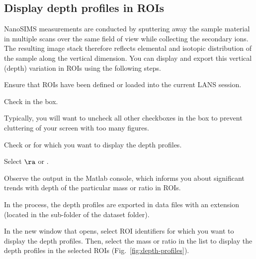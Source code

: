 \subsection{Display depth profiles in ROIs}
\setcounter{step}{0}

NanoSIMS measurements are conducted by sputtering away the sample material in multiple scans over the same field of view while collecting the secondary ions. The resulting image stack therefore reflects elemental and isotopic distribution of the sample along the vertical dimension. You can display and export this vertical (depth) variation in ROIs using the following steps.

\s Ensure that ROIs have been defined or loaded into the current LANS session.

\s Check  in the  box.

\bul Typically, you will want to uncheck all other checkboxes in the  box to prevent cluttering of your screen with too many figures.

\s Check  or  for which you want to display the depth profiles.

\s Select  $\ra$  or .

\bul Observe the output in the Matlab console, which informs you about significant trends with depth of the particular mass or ratio in ROIs.

\bul In the process, the depth profiles are exported in data files with an extension  (located in the  sub-folder of the dataset folder).

\s In the new window that opens, select ROI identifiers for which you want to display the depth profiles. Then, select the mass or ratio in the list to display the depth profiles in the selected ROIs (Fig.~\ref{fig:depth-profiles}).

